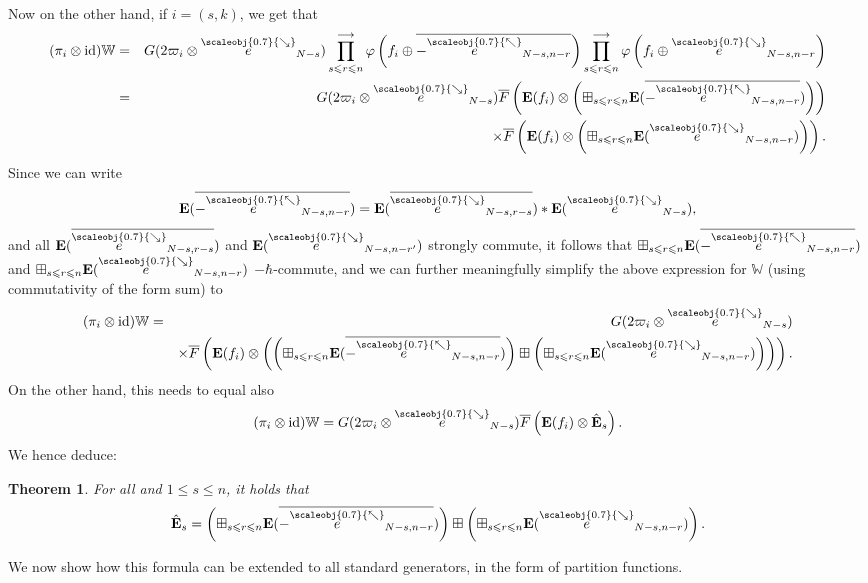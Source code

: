 \documentclass[11pt, reqno]{amsart}
\newtheorem{theorem}{Theorem}[section]
\theoremstyle{definition}
\numberwithin{equation}{section}
\def\longra{\longrightarrow}
\newcommand{\hr}[1]{\left(#1\right)}                                                    %
\def\le{\leqslant}
\newcommand{\eb}{\mathbf{E}}
\newcommand{\Gauss}{G}
\newcommand{\sears}{\scaleobj{0.7}{\searrow}}
\newcommand{\nwars}{\scaleobj{0.7}{\nwarrow}}
\newcommand{\seee}{\overset{\sears}{e}}
\newcommand{\nwe}{\overset{\nwars}{e}}
\newcommand{\id}{\mathrm{id}}
\newcommand{\Eb}{\mathbf{E}}
\newcommand{\Wbb}{\mathbb{W}}
\begin{document}
Now on the other hand, if $i = (s,k)$, we get that 
\begin{eqnarray*}
(\pi_i \otimes \id)\Wbb &=& \Gauss(2\varpi_i \otimes \seee_{N-s}) \prod_{s \le r \le n}^{\longra} \varphi\hr{f_i\oplus \overline{-\nwe_{N-s,n-r}}}   \prod_{s \le r \le n}^{\longra}\varphi\hr{f_i\oplus \seee_{N-s,n-r}}\\
&=&  \Gauss(2\varpi_i \otimes \seee_{N-s})  \overline{F}\hr{\eb(f_i)\otimes  \left(\boxplus_{s \le r \le n} \eb(\overline{-\nwe_{N-s,n-r}})\right)}\\
&& \hspace{5cm} \times \overline{F}\hr{\eb(f_i)\otimes  \left(\boxplus_{s \le r \le n} \eb(\seee_{N-s,n-r})\right)}.
\end{eqnarray*}
Since we can write 
\[
\Eb(\overline{-\nwe_{N-s,n-r}}) = \Eb(\overline{\seee_{N-s,r-s}})*\Eb(\seee_{N-s}),
\]
and all $\Eb(\overline{\seee_{N-s,r-s}})$ and $\Eb(\seee_{N-s,n-r'})$ strongly commute, it follows that $\boxplus_{s \le r \le n} \eb(\overline{-\nwe_{N-s,n-r}})$ and $\boxplus_{s \le r \le n} \eb(\seee_{N-s,n-r})$ $-\hbar$-commute, and we can further meaningfully simplify the above expression for $\Wbb$ (using commutativity of the form sum) to 
\begin{eqnarray*}
(\pi_i \otimes \id)\Wbb &=&  \Gauss(2\varpi_i \otimes \seee_{N-s})\\
&& 
\times \overline{F}\hr{\eb(f_i)\otimes  \left(\left(\boxplus_{s \le r \le n} \eb(\overline{-\nwe_{N-s,n-r}}) \right)\boxplus \left(\boxplus_{s \le r \le n} \eb(\seee_{N-s,n-r})\right)\right)}.
\end{eqnarray*}
On the other hand, this needs to equal  also 
\[
(\pi_i\otimes \id)\Wbb = \Gauss(2\varpi_i \otimes \seee_{N-s})
\overline{F}\hr{\eb(f_i)\otimes  \hat{\Eb}_s}.
\]
We hence deduce:
\begin{theorem}
For all and $1\leq s\leq n$, it holds that
\begin{equation}
\hat{\Eb}_s = \left(\boxplus_{s \le r \le n} \eb(\overline{-\nwe_{N-s,n-r}}) \right)\boxplus \left(\boxplus_{s \le r \le n} \eb(\seee_{N-s,n-r})\right).
\end{equation}
\end{theorem}



We now show how this formula can be extended to all standard generators, in the form of partition functions.
\end{document}
